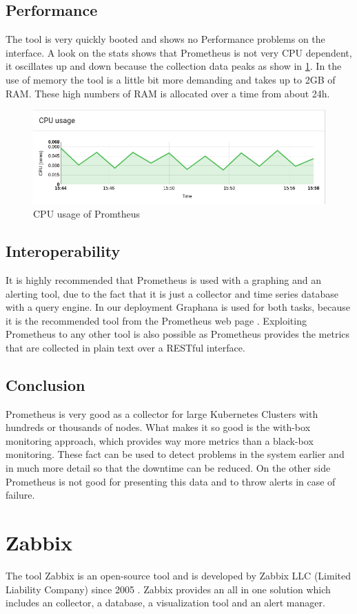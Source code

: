\subsection{Performance}
The tool is very quickly booted and shows no Performance problems on the interface. A look on the stats shows that Prometheus is not very CPU dependent, it oscillates up and down because the collection data peaks as show in \cref{fig:Prometeus_Cpu}. In the use of memory the tool is a little bit more demanding and takes up to 2GB of RAM. These high numbers of RAM is allocated over a time from about 24h. 
\begin{figure}
\centering
\includegraphics[width=0.5\linewidth]{Bilder/Performance/Prometeus_Cpu}
\caption{CPU usage of Promtheus}
\label{fig:Prometeus_Cpu}
\end{figure}
\subsection{Interoperability}
It is highly recommended that Prometheus is used with a graphing and an alerting tool, due to the fact that it is just a collector and time series database with a query engine. In our deployment Graphana is used for both tasks, because it is the recommended tool from the Prometheus web page \cite{prometheus}. Exploiting Prometheus to any other tool is also possible as Prometheus provides the metrics that are collected in plain text over a RESTful interface.
\subsection{Conclusion}
Prometheus is very good as a collector for large Kubernetes Clusters with hundreds or thousands of nodes. What makes it so good is the with-box monitoring approach, which provides way more metrics than a black-box monitoring. These fact can be used to detect problems in the system earlier and in much more detail so that the downtime can be reduced. On the other side Prometheus is not good for presenting this data and to throw alerts in case of failure.

\section{Zabbix}
\label{Zabbix} %
\cite{Hernantes2015}
The tool Zabbix is an open-source tool and is developed by Zabbix LLC (Limited Liability Company) since 2005 \cite{zabbix}. Zabbix provides an all in one solution which includes an collector, a database, a visualization tool and an alert manager.
